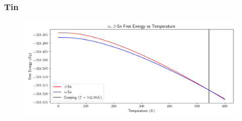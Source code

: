 \documentclass{beamer}
\begin{document}
\begin{frame}
	\frametitle{Tin}
	\begin{figure}[ht]
	\begin{center}
	\includegraphics[height=2in]{tin_transition_temperature.png}
	\end{center}
	\end{figure}
\end{frame}
\end{document}
